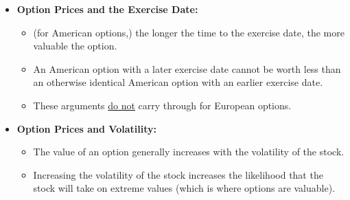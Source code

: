 \documentclass{beamer}
\begin{document}
\begin{frame}{}
	\begin{itemize}
		\item \textbf{Option Prices and the Exercise Date:} 
		\begin{itemize}
			\item (for American options,) the longer the time to the exercise date, the more valuable the option.
			\item An American option with a later exercise date cannot be worth less than an otherwise identical American option with an earlier exercise date.
			\item These arguments \underline{do not} carry through for European options.
		\end{itemize}
		\item \textbf{Option Prices and Volatility:} 
		\begin{itemize}
			\item The value of an option generally increases with the volatility of the stock.
			\item Increasing the volatility of the stock increases the likelihood that the stock will take on extreme values (which is where options are valuable).
		\end{itemize}
	\end{itemize}
\end{frame}
\end{document}
